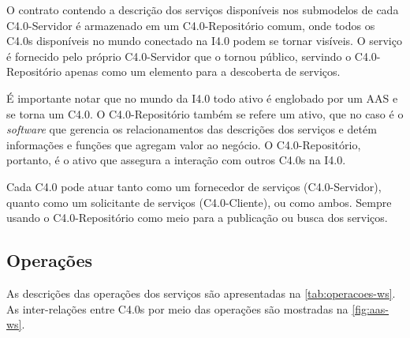O contrato contendo a descrição dos serviços disponíveis nos submodelos de cada C4.0-Servidor é armazenado em um C4.0-Repositório comum, onde todos os C4.0s disponíveis no mundo conectado na I4.0 podem se tornar visíveis. O serviço é fornecido pelo próprio C4.0-Servidor que o tornou público, servindo o C4.0-Repositório apenas como um elemento para a descoberta de serviços.

É importante notar que no mundo da I4.0 todo ativo é englobado por um AAS e se torna um C4.0. O C4.0-Repositório também se refere um ativo, que no caso é o \textit{software} que gerencia os relacionamentos das descrições dos serviços e detém informações e funções que agregam valor ao negócio. O C4.0-Repositório, portanto, é o ativo que assegura a interação com outros C4.0s na I4.0.

Cada C4.0 pode atuar tanto como um fornecedor de serviços (C4.0-Servidor), quanto como um solicitante de serviços (C4.0-Cliente), ou como ambos. Sempre usando o C4.0-Repositório como meio para a publicação ou busca dos serviços.

\subsection{Operações}

As descrições das operações dos serviços são apresentadas na \autoref{tab:operacoes-ws}. As inter-relações entre C4.0s por meio das operações são mostradas na \autoref{fig:aas-ws}.

